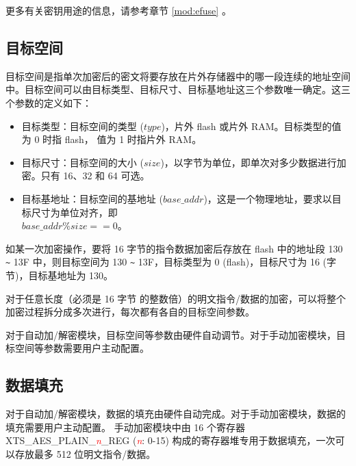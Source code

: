\documentclass[main\_\_CN.tex]{subfiles}
\begin{document}
更多有关密钥用途的信息，请参考章节 \ref{mod:efuse} \textit{}。

\subsection{目标空间} \label{object space}
目标空间是指单次加密后的密文将要存放在片外存储器中的哪一段连续的地址空间中。目标空间可以由目标类型、目标尺寸、目标基地址这三个参数唯一确定。这三个参数的定义如下：
\begin{itemize}
    \item 目标类型：目标空间的类型 (\begin{math} type \end{math})，片外 flash 或片外 RAM。目标类型的值为 0 时指 flash， 值为 1 时指片外 RAM。
    \item 目标尺寸：目标空间的大小 (\begin{math} size \end{math})，以字节为单位，即单次对多少数据进行加密。只有 16、32 和 64 可选。
    \item 目标基地址：目标空间的基地址 (\begin{math} base\_addr\end{math})，这是一个物理地址，要求以目标尺寸为单位对齐，即\\ \begin{math} base\_addr \% size == 0 \end{math}。
\end{itemize}

如某一次加密操作，要将 16 字节的指令数据加密后存放在 flash 中的地址段 \hexprefix{}130 \verb+~+ \hexprefix{}13F 中，则目标空间为 \hexprefix{}130 \verb+~+ \hexprefix{}13F，目标类型为 0 (flash)，目标尺寸为 16 (字节)，目标基地址为 \hexprefix{}130。

对于任意长度（必须是 16 字节 的整数倍）的明文指令/数据的加密，可以将整个加密过程拆分成多次进行，每次都有各自的目标空间参数。

对于自动加/解密模块，目标空间等参数由硬件自动调节。对于手动加密模块，目标空间等参数需要用户主动配置。


\subsection{数据填充} \label{XTS data rule}

对于自动加/解密模块，数据的填充由硬件自动完成。对于手动加密模块，数据的填充需要用户主动配置。
手动加密模块中由 16 个寄存器 XTS\_AES\_PLAIN\_\textcolor{red}{\it{n}}\_REG (\textcolor{red}{\it{n}}: 0-15) 构成的寄存器堆专用于数据填充，一次可以存放最多 512 位明文指令/数据。
\end{document}
